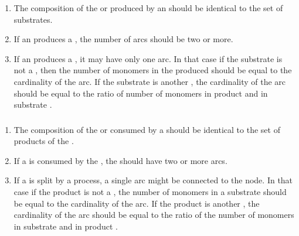   \begin{enumerate}
    \item The composition of the  or  produced by
    an  should be identical to the set of  substrates.
    \item If an  produces a , the number of 
     arcs should be two or more.
    \item If an  produces a , it may have only one 
     arc. In that case if the substrate is not a
    , then the number of monomers in the produced 
    should be equal to the cardinality of the  arc. If the substrate is another
    , the cardinality of the  arc should be equal to the
    ratio of number of monomers in product and in substrate .
  \end{enumerate}  

\subsubsection{}
  \begin{enumerate}
    \item The composition of the  or  consumed by a
     should be identical to the set of products of the .
    \item If a  is consumed by the , the
     should have two or more  arcs.
    \item If a  is split by a  process,
    a single  arc might be connected to the  node. In that case if the product is not a
    , the number of monomers in a substrate 
    should be equal to the cardinality of the  arc. If the product is another
    , the cardinality of the  arc should be equal to the 
    ratio of the number of monomers in substrate and in product .
  \end{enumerate}  
  